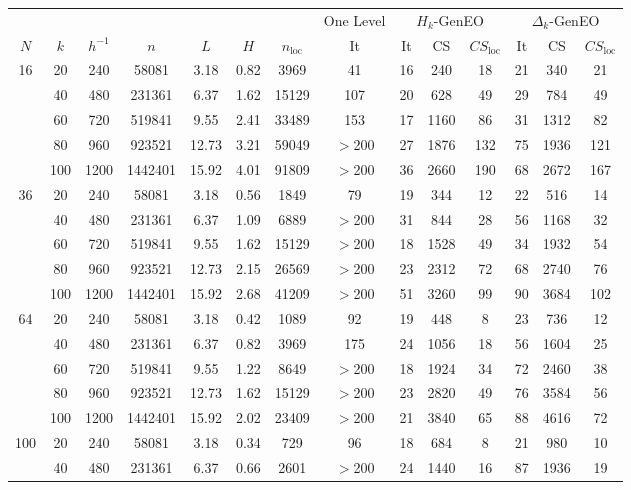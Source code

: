 \documentclass[preprint,3p,times]{elsarticle}
\theoremstyle{definition}
\numberwithin{equation}{section}
\begin{document}
\begin{table}[H]
    \centering
\begin{tabular}{ccccccc|c|ccc|ccc}
\multicolumn{7}{c|}{} & One Level & \multicolumn{3}{c}{$H_k$-GenEO} & \multicolumn{3}{c}{$\Delta_k$-GenEO} \\
$N$ & $k$ & $h^{-1}$ & $n$ & $L$ & $H$ & $n_\text{loc}$ & It & It & CS & $CS_\text{loc}$ & It & CS & $CS_\text{loc}$  \\
\hline
16 & 20 & 240 & 58081 & 3.18 & 0.82 & 3969 & 41 & 16 & 240 & 18 & 21 & 340 & 21 \\
 & 40 & 480 & 231361 &  6.37 & 1.62 & 15129 & 107 & 20 & 628 & 49 & 29 & 784 & 49 \\
 & 60 & 720 & 519841 &  9.55 & 2.41 & 33489 & 153 & 17 & 1160 & 86 & 31 & 1312 & 82 \\
 & 80 & 960 & 923521 &  12.73 & 3.21 & 59049 & $>$200 & 27 & 1876 & 132 & 75 & 1936 & 121 \\
 & 100 & 1200 & 1442401 &  15.92 & 4.01 & 91809 & $>$200 & 36 & 2660 & 190 & 68 & 2672 & 167 \\
\hline
36 & 20 & 240 & 58081 & 3.18 & 0.56 & 1849 & 79 & 19 & 344 & 12 & 22 & 516 & 14 \\
 & 40 & 480 & 231361 &  6.37 & 1.09 & 6889 & $>$200 & 31 & 844 & 28 & 56 & 1168 & 32 \\
 & 60 & 720 & 519841 &  9.55 & 1.62 & 15129 & $>$200 & 18 & 1528 & 49 & 34 & 1932 & 54 \\
 & 80 & 960 & 923521 &  12.73 & 2.15 & 26569 & $>$200 & 23 & 2312 & 72 & 68 & 2740 & 76 \\
 & 100 & 1200 & 1442401 &  15.92 & 2.68 & 41209 & $>$200 & 51 & 3260 & 99 & 90 & 3684 & 102 \\
\hline
64 & 20 & 240 & 58081 & 3.18 & 0.42 & 1089 & 92 & 19 & 448 & 8 & 23 & 736 & 12 \\
 & 40 & 480 & 231361 &  6.37 & 0.82 & 3969 & 175 & 24 & 1056 & 18 & 56 & 1604 & 25 \\
 & 60 & 720 & 519841 &  9.55 & 1.22 & 8649 & $>$200 & 18 & 1924 & 34 & 72 & 2460 & 38 \\
 & 80 & 960 & 923521 &  12.73 & 1.62 & 15129 & $>$200 & 23 & 2820 & 49 & 76 & 3584 & 56 \\
 & 100 & 1200 & 1442401 &  15.92 & 2.02 & 23409 & $>$200 & 21 & 3840 & 65 & 88 & 4616 & 72 \\
\hline
100 & 20 & 240 & 58081 & 3.18 & 0.34 & 729 & 96 & 18 & 684 & 8 & 21 & 980 & 10 \\
 & 40 & 480 & 231361 &  6.37 & 0.66 & 2601 & $>$200 & 24 & 1440 & 16 & 87 & 1936 & 19 \\

\end{tabular}
\end{table}
\end{document}
